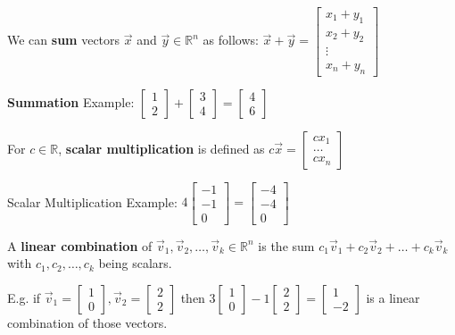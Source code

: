 \documentclass{letter}
\begin{document}
	We can \textbf{sum} vectors $\vec x$ and $\vec y \in \mathbb{R}^n$ as follows: $\vec x + \vec y = \begin{bmatrix}x_1 + y_1\\x_2+y_2\\\vdots\\x_n + y_n\end{bmatrix}$
	
	\textbf{Summation} Example: $\begin{bmatrix}1\\2\end{bmatrix} + \begin{bmatrix}3\\4\end{bmatrix} = \begin{bmatrix}4\\6\end{bmatrix}$
	
	For $c \in \mathbb{R}$, \textbf{scalar multiplication} is defined as $c\vec x = \begin{bmatrix}cx_1\\\dots\\cx_n\end{bmatrix}$
	
	Scalar Multiplication Example: $4\begin{bmatrix}
	-1\\-1\\0\end{bmatrix} = \begin{bmatrix}
	-4\\-4\\0\end{bmatrix}$
	
	\clearpage
	
	A \textbf{linear combination} of $\vec v_1, \vec v_2, \dots, \vec v_k \in \mathbb{R}^n$ is the sum $c_1\vec v_1 + c_2\vec v_2 + \dots + c_k \vec v_k$ with $c_1, c_2, \dots, c_k$ being scalars.
	
	E.g. if $\vec v_1 = \begin{bmatrix}1\\0\end{bmatrix}, \vec v_2 = \begin{bmatrix}2\\2\end{bmatrix}$ then $3\begin{bmatrix}1\\0\end{bmatrix} -1\begin{bmatrix}2\\2\end{bmatrix} = \begin{bmatrix}1\\-2\end{bmatrix}$ is a linear combination of those vectors.
	
\end{document}
